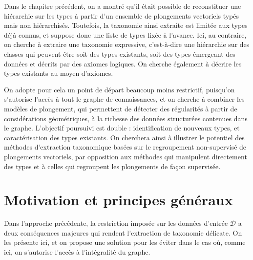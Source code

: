 \label{chap:texp}


Dans le chapitre précédent, on a montré qu'il était possible de reconstituer une hiérarchie sur les types à partir d'un ensemble de plongements vectoriels typés mais non hiérarchisés. Toutefois, la taxonomie ainsi extraite est limitée aux types déjà connus, et suppose donc une liste de types fixée à l'avance. 
Ici, au contraire, on cherche à extraire une taxonomie expressive, c'est-à-dire une hiérarchie sur des classes qui peuvent être soit des types existants, soit des types émergeant des données et décrits par des axiomes logiques. On cherche également à décrire les types existants au moyen d'axiomes.


On adopte pour cela un point de départ beaucoup moins restrictif, puisqu'on s'autorise l'accès à tout le graphe de connaissances, et on cherche à combiner les modèles de plongement, qui permettent de détecter des régularités à partir de considérations géométriques, à la richesse des données structurées contenues dans le graphe. L'objectif poursuivi est double :
%
identification de nouveaux types, et caractérisation des types existants. On cherchera ainsi à illustrer le potentiel des méthodes d'extraction taxonomique basées sur le regroupement non-supervisé de plongements vectoriels, par opposition aux méthodes qui manipulent directement des types et à celles qui regroupent les plongements de façon supervisée.



\section{Motivation et principes généraux}

Dans l'approche précédente, la restriction imposée sur les données d'entrée $\mathcal{D}$ a deux conséquences majeures qui rendent l'extraction de taxonomie délicate. On les présente ici, et on propose une solution pour les éviter dans le cas où, comme ici, on s'autorise l'accès à l'intégralité du graphe.


